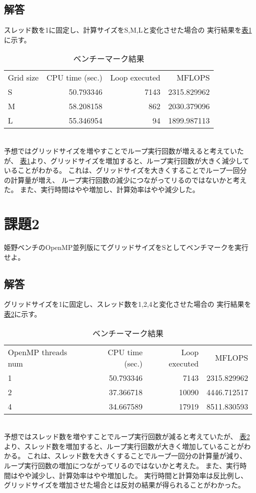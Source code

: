 \documentclass[]{jarticle}          %
\begin{document}
\subsection{解答}
スレッド数を1に固定し、計算サイズをS,M,Lと変化させた場合の
実行結果を\hyperref[one]{表\ref{one}}に示す。
\begin{table}[ht!]
  \begin{center}
    \begin{tabular}{lrrr}
      Grid size & CPU time (sec.) & Loop executed & MFLOPS \\
      S & 50.793346 & 7143 & 2315.829962 \\
      M & 58.208158 & 862 & 2030.379096 \\
      L & 55.346954 & 94 & 1899.987113 \\
    \end{tabular}
    \caption{ベンチーマーク結果}
    \label{one}
  \end{center}
\end{table}
\\
予想ではグリッドサイズを増やすことでループ実行回数が増えると考えていたが、
\hyperref[one]{表\ref{one}}より、グリッドサイズを増加すると、ループ実行回数が大きく減少していることがわかる。
これは、グリッドサイズを大きくすることでループ一回分の計算量が増え、
ループ実行回数の減少につながってリるのではないかと考えた。
また、実行時間はやや増加し、計算効率はやや減少した。


\section{課題2}
姫野ベンチのOpenMP並列版にてグリッドサイズをSとしてベンチマークを実行せよ。
\subsection{解答}
グリッドサイズを1に固定し、スレッド数を1,2,4と変化させた場合の
実行結果を\hyperref[two]{表\ref{two}}に示す。
\begin{table}[ht!]
  \begin{center}
    \begin{tabular}{lrrr}
      OpenMP threads num & CPU time (sec.) & Loop executed & MFLOPS \\
      1 & 50.793346 & 7143 & 2315.829962 \\
      2 & 37.366718 & 10090 & 4446.712517 \\
      4 & 34.667589 & 17919 & 8511.830593 \\
    \end{tabular}
    \caption{ベンチーマーク結果}
    \label{two}
  \end{center}
\end{table}
\\
予想ではスレッド数を増やすことでループ実行回数が減ると考えていたが、
\hyperref[two]{表\ref{two}}より、スレッド数を増加すると、ループ実行回数が大きく増加していることがわかる。
これは、スレッド数を大きくすることでループ一回分の計算量が減り、
ループ実行回数の増加につながってリるのではないかと考えた。
また、実行時間はやや減少し、計算効率はやや増加した。
実行時間と計算効率は反比例し、グリッドサイズを増加させた場合とは反対の結果が得られることがわかった。
\end{document}
